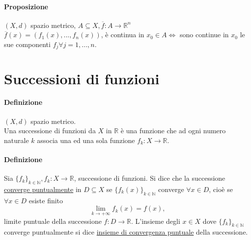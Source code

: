 \documentclass{article}
\newcommand{\R}{\mathbb{R}}
\newcommand{\N}{\mathbb{N}}
\begin{document}
\paragraph{{Proposizione}}
$(X,d)$ spazio metrico, $A \subseteq X, \overline{f}: A \rightarrow \R^n$\\
$\overline{f}(x)=(f_1(x),...,f_n(x))$, è continua in $x_0 \in A \Leftrightarrow$ sono continue in $x_0$ le sue componenti $f_j \forall j=1,...,n$.

\section{\Large\textbf{Successioni di funzioni}}
\paragraph{{Definizione}}
$(X,d)$ spazio metrico.\\
Una successione di funzioni da $X$ in $\R$ è una funzione che ad ogni numero naturale $k$ associa una ed una sola funzione $f_k:X\rightarrow \R$. 

\paragraph{{Definizione}}
Sia $\{ f_k \}_{k\in\N}, f_k:X \rightarrow \R$, successione di funzioni. Si dice che la successione \underline{converge puntualmente} in $D \subseteq X$ se $\{f_k(x)\}_{k\in\N}$ converge $\forall x \in D$, cioè se $\forall x \in D$ esiste finito
\begin{equation*}
    \lim_{k\rightarrow +\infty} f_k(x)=f(x),
\end{equation*}
limite puntuale della successione $f : D \rightarrow \R$. L'insieme degli $x \in X$ dove $\{f_k \}_{k \in \N}$ converge puntualmente si dice \underline{insieme di convergenza puntuale} della successione.
\end{document}
